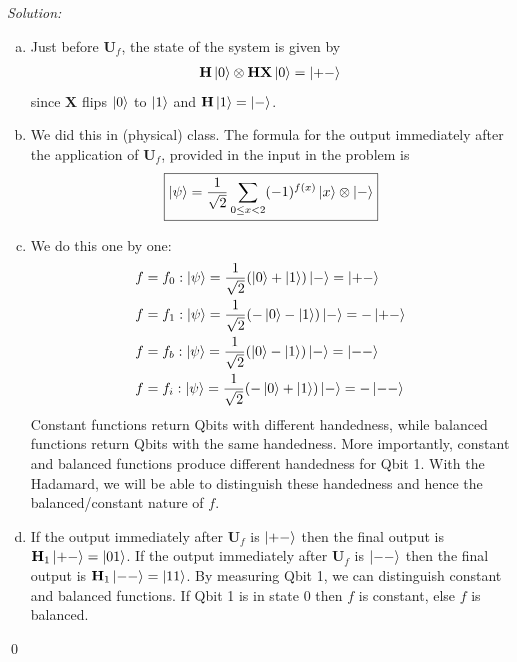 \documentclass{book}
\theoremstyle{definition}
\newcommand{\nn}{\nonumber}
\newcommand{\X}{\mathbf{X}}
\newcommand{\f}[2]{\frac{#1}{#2}}
\newcommand{\U}{\mathbf{U}}
\newcommand{\had}{\mathbf{H}}
\begin{document}
\newpage

\noindent \textit{Solution:}

\begin{enumerate}[(a)]
	\item Just before $\U_f$, the state of the system is given by
	\begin{align}
	\had \ket{ 0} \otimes \had \X \ket{0} = \ket{+-}
	\end{align}
	since $\X$ flips $\ket{0}$ to $\ket{1}$ and $\had\ket{1} = \ket{-}$. 
	
	
	\item We did this in (physical) class. The formula for the output immediately after the application of $\U_f$, provided in the input in the problem is  
	\begin{align}
	\boxed{\ket{\psi} = \f{1}{\sqrt{2}}  \sum_{0 \leq x < 2} (-1)^{f(x)}\ket{x} \otimes \ket{-}   }
	\end{align}
	
	
	\item We do this one by one:
	\begin{align}
	&f = f_{0}: \ket{ \psi } = \f{1}{\sqrt{2}} (\ket{0} + \ket{1})  \ket{-} = \ket{+-}\nn\\
	&f = f_{1}: \ket{ \psi } = \f{1}{\sqrt{2}} (-\ket{0} - \ket{1})  \ket{-} = -\ket{+-}\nn\\
	&f = f_{b}: \ket{ \psi } = \f{1}{\sqrt{2}} (\ket{0} - \ket{1})  \ket{-} = \ket{--}\nn\\
	&f = f_{i}: \ket{ \psi } = \f{1}{\sqrt{2}} (-\ket{0} + \ket{1})  \ket{-} = -\ket{--}
	\end{align}
	Constant functions return Qbits with different handedness, while balanced functions return Qbits with the same handedness. More importantly, constant and balanced functions produce different handedness for Qbit 1. With the Hadamard, we will be able to distinguish these handedness and hence the balanced/constant nature of $f$.
	
	
	
	
	\item If the output immediately after $\U_f$ is $\ket{+-}$ then the final output is $\had_1\ket{+-} = \ket{01}$. If the output immediately after $\U_f$ is $\ket{--}$ then the final output is $\had_1\ket{--} = \ket{11}$. By measuring Qbit 1, we can distinguish constant and balanced functions. If Qbit 1 is in state 0 then $f$ is constant, else $f$ is balanced. 
\end{enumerate}


\qed
\end{document}
